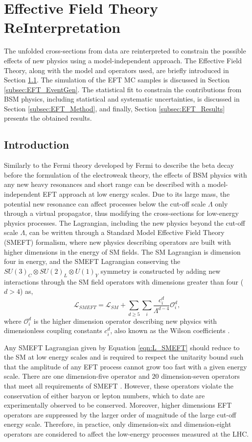 \section{Effective Field Theory ReInterpretation}
\label{sec:EFT}
The unfolded cross-sections from data are reinterpreted to constrain the possible effects of new physics using a model-independent approach. The Effective Field Theory, along with the model and operators used, are briefly introduced in Section \ref{subsec:EFT_Intro}. The simulation of the EFT MC samples is discussed in Section \ref{subsec:EFT_EventGen}. The statistical fit to constrain the contributions from BSM physics, including statistical and systematic uncertainties, is discussed in Section \ref{subsec:EFT_Method}, and finally, Section \ref{subsec:EFT_Results} presents the obtained results. 

\subsection{Introduction}
\label{subsec:EFT_Intro}
Similarly to the Fermi theory developed by Fermi to describe the beta decay before the formulation of the electroweak theory, the effects of BSM physics with any new heavy resonances and short range can be described with a model-independent EFT approach at low energy scales. Due to its large mass, the potential new resonance can affect processes below the cut-off scale $\Lambda$ only through a virtual propagator, thus modifying the cross-sections for low-energy physics processes. The Lagrangian, including the new physics beyond the cut-off scale $\Lambda$, can be written through a Standard Model Effective Field Theory (SMEFT) formalism, where new physics describing operators are built with higher dimensions in the energy of SM fields. The SM Lagrangian is dimension four in energy, and the SMEFT Lagrangian conserving the $SU(3)_{C} \otimes SU(2)_{L} \otimes U(1)_{Y}$ symmetry is constructed by adding new interactions through the SM field operators with dimensions greater than four ($d>4$) as, 
\begin{equation}
\label{eqn:L_SMEFT}
\mathcal{L}_{SMEFT} = \mathcal{L}_{SM} + \sum_{d \geq 5}\sum_{i}\frac{c_{i}^{d}}{\Lambda^{d-4}}\mathcal{O}_{i}^{d},
\end{equation}
where $\mathcal{O}_{i}^{d}$ is the higher dimension operator describing new physics with dimensionless coupling constants $c_{i}^{d}$, also known as the Wilson coefficients \cite{SMEFT}. 

Any SMEFT Lagrangian given by Equation \ref{eqn:L_SMEFT} should reduce to the SM at low energy scales and is required to respect the unitarity bound such that the amplitude of any EFT process cannot grow too fast with a given energy scale. There are one dimension-five operator and $20$ dimension-seven operators that meet all requirements of SMEFT \cite{SMEFT}\cite{Dim7_EFT}. However, these operators violate the conservation of either baryon or lepton numbers, which to date are experimentally observed to be conserved. Moreover, higher dimensions EFT operators are suppressed by the larger order of magnitude of the large cut-off energy scale. Therefore, in practice, only dimension-six and dimension-eight operators are considered to affect the low-energy processes measured at the LHC.

